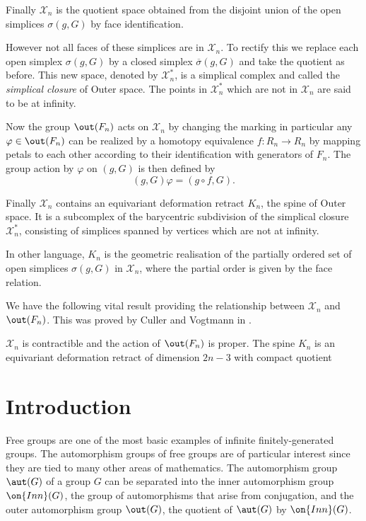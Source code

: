 Finally $\mathcal{X}_{n}$ is the quotient space obtained from the disjoint union of the open simplices $\sigma(g,G)$ by face identification.

However not all faces of these simplices are in $\mathcal{X}_{n}$.
To rectify this we replace each open simplex $\sigma(g,G)$ by a closed simplex $\overline{\sigma}(g,G)$ and take
the quotient as before. This new space, denoted by $\mathcal{X}^{*}_{n}$, is a simplical complex and called the \emph{simplical closure} of Outer space.
The points in $\mathcal{X}^{*}_{n}$ which are not in $\mathcal{X}_{n}$ are said to be at infinity.

 Now the group $\out(F_{n})$ acts on $\mathcal{X}_{n}$ by changing the marking in particular
 any $\varphi \in \out(F_{n})$ can be realized by a homotopy equivalence $f: R_{n} \to R_{n}$
 by mapping petals to each other according to their identification with generators of $F_{n}$.
 The group action by $\varphi$ on $(g,G)$ is then defined by
 \[
	 (g,G) \varphi = (g \circ f, G)
 .\] 

 Finally $\mathcal{X}_{n}$ contains an equivariant deformation retract $K_{n}$, the spine of Outer space.
 It is a subcomplex of the barycentric subdivision of the simplical closure $\mathcal{X}_{n}^{*}$, consisting of simplices spanned by vertices which are not at infinity.

 In other language, $K_{n}$ is the geometric realisation of the partially ordered set of open simplices $\sigma(g,G)$ in $\mathcal{X}_{n}$, where 
 the partial order is given by the face relation.

 We have the following vital result providing the relationship between $\mathcal{X}_{n}$ and $\out(F_{n})$. This was proved by Culler and Vogtmann in \cite{vogtmann86}.
 \begin{theorem}
	 $\mathcal{X}_{n}$ is contractible and the action of $\out(F_{n})$ is proper.
	 The spine $K_{n}$ is an equivariant deformation retract of dimension $2 n - 3$ with compact quotient
 \end{theorem}
 
 \section{Introduction\footnotemark}
Free groups are one of the most basic examples of infinite finitely-generated groups.
The automorphism groups of free groups are of particular interest since they are tied to many other areas of mathematics.
The automorphism group $\aut(G)$ of a group $G$ can be separated into the inner automorphism group $\on{Inn}(G)$,
the group of automorphisms that arise from conjugation, and the outer automorphism group $\out(G)$, the quotient of  $\aut(G)$ by $\on{Inn}(G)$.

